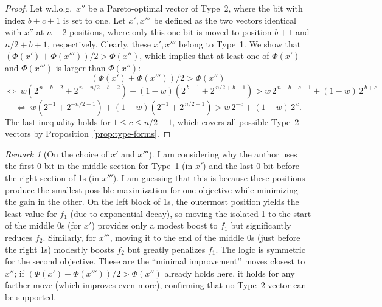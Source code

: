 \documentclass[a4paper, 11pt]{report}
\theoremstyle{remark}
\newtheorem*{remark}{Remark}
\begin{document}
\begin{proof}
Let w.l.o.g.\ $x''$ be a Pareto-optimal vector of Type~2, where the bit with index $b+c+1$ is set to one. Let $x',x'''$ be defined as the two vectors 
identical with $x''$ at $n-2$ positions, where only this one-bit is moved to position $b+1$ and $n/2+b+1$, respectively. Clearly, these $x',x'''$ belong to 
Type~1. We show that $(\Phi(x')+\Phi(x'''))/2>\Phi(x'')$, which implies that at least one of $\Phi(x')$ and $\Phi(x''')$ is larger than $\Phi(x'')$:
\[
(\Phi(x')+\Phi(x'''))/2>\Phi(x'')
\]
\[
\Leftrightarrow\;
w\!\left(2^{\,n-b-2}+2^{\,n-n/2-b-2}\right)
+(1-w)\!\left(2^{\,b-1}+2^{\,n/2+b-1}\right)
>
w\,2^{\,n-b-c-1}+(1-w)\,2^{\,b+c}
\]
\[
\Leftrightarrow\;
w\!\left(2^{-1}+2^{-n/2-1}\right)
+(1-w)\!\left(2^{-1}+2^{\,n/2-1}\right)
>
w\,2^{-c}+(1-w)\,2^{\,c}.
\]
The last inequality holds for $1\le c\le n/2-1$, which covers all possible Type~2 vectors by Proposition~\ref{prop:type-forms}. \qedhere
\end{proof}
\begin{remark}[On the choice of $x'$ and $x'''$]
    I am considering why the author uses the first 0 bit in the middle section for Type~1 (in \(x'\)) and the last 0 bit before the right section of 1s (in \(x'''\)). 
    I am guessing that this is because these positions produce the smallest possible maximization for one objective while minimizing the gain in the other. 
    On the left block of 1s, the outermost position yields the least value for \(f_1\) (due to exponential decay), so moving the isolated 1 to the start of the middle 0s 
    (for \(x'\)) provides only a modest boost to \(f_1\) but significantly reduces \(f_2\). Similarly, for \(x'''\), moving it to the end of the middle 0s (just before the 
    right 1s) modestly boosts \(f_2\) but greatly penalizes \(f_1\). The logic is symmetric for the second objective. These are the “minimal improvement’’ moves closest to \(x''\); 
    if \((\Phi(x')+\Phi(x'''))/2>\Phi(x'')\) already holds here, it holds for any farther move (which improves even more), confirming that no Type~2 vector can be supported.
\end{remark}


\newpage
\printbibliography
\end{document}
